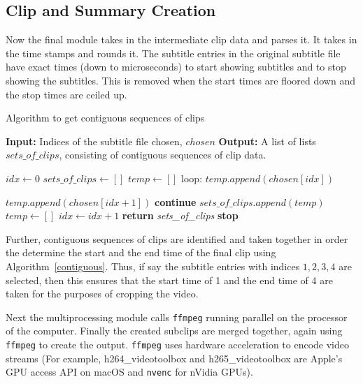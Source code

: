		\subsection{Clip and Summary Creation}	
			Now the final module takes in the intermediate clip data and parses it. It takes in the time stamps and rounds it. The subtitle entries in the original subtitle file have exact times (down to microseconds) to start showing subtitles and to stop showing the subtitles. This is removed when the start times are floored down and the stop times are ceiled up. 
			
			\begin{algorithm}
		\caption{Algorithm to get contiguous sequences of clips}
		\label{contiguous}
		\textbf{Input:} Indices of the subtitle file chosen, $chosen$
		\textbf{Output:} A list of lists $sets\_of\_clips$, consisting of contiguous sequences of clip data.
		
		\begin{algorithmic}[1]
				\State $idx \leftarrow 0$
				\State $sets\_of\_clips \leftarrow []$
				\State $temp \leftarrow []$
				\BState loop:
						\State $temp.append(chosen[idx])$
					\EndIf
					
            			\State $temp.append(chosen[idx+1])$
            			\State \textbf{continue}
			        \Else
			            \State $sets\_of\_clips.append(temp)$
			            \State $temp \leftarrow []$
					\EndIf
							\State $idx \leftarrow idx + 1$
						\Else
						    \State \textbf{return} \textit{sets\_of\_clips}
							\State \textbf{stop}
						\EndIf
			\EndProcedure
		\end{algorithmic}
	\end{algorithm}
			
			Further, contiguous sequences of clips are identified and taken together in order the determine the start and the end time of the final clip using Algorithm~\ref{contiguous}. Thus, if say the subtitle entries with indices $1,2,3,4$ are selected, then this ensures that the start time of 1 and the end time of 4 are taken for the purposes of cropping the video.
			
			Next the multiprocessing module calls \verb|ffmpeg| running parallel on the processor of the computer. Finally the created subclips are merged together, again using \verb|ffmpeg| to create the output. \verb|ffmpeg| uses hardware acceleration to encode video streams (For example, h264\_videotoolbox and h265\_videotoolbox are Apple's GPU access API on macOS and \verb|nvenc| for nVidia GPUs).
			
